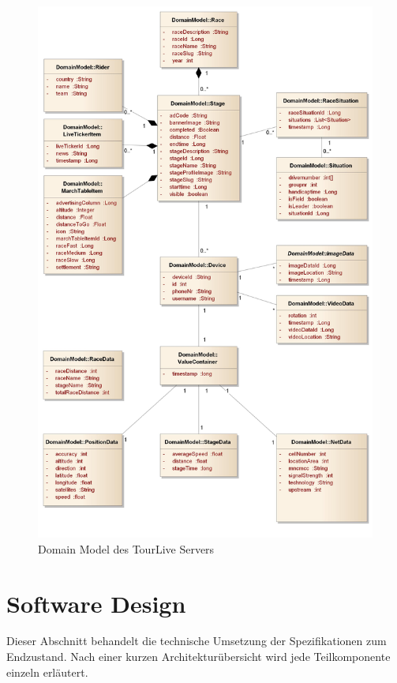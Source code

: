 \begin{figure}[H]
	\centering
	\includegraphics[width=130mm]{images/tourliveweb/TourLiveServer_DomainModel_ohneRand.jpg}
	\caption{Domain Model des TourLive Servers}
	\label{fig:tourliveserverdomainmodel}
\end{figure}
\newpage

\section{Software Design}
\label{sec:tourliveserversoftwaredesign}
Dieser Abschnitt behandelt die technische Umsetzung der Spezifikationen zum Endzustand. Nach einer kurzen Architekturübersicht wird jede Teilkomponente einzeln erläutert.

